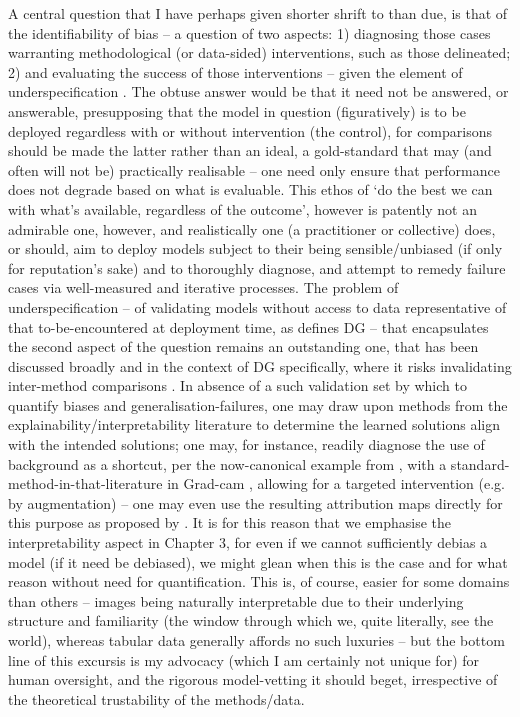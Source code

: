 %
A central question that I have perhaps given shorter shrift to than due, is that of the
identifiability of bias -- a question of two aspects: 1) diagnosing those cases warranting
methodological (or data-sided) interventions, such as those delineated; 2) and evaluating the
success of those interventions -- given the element of underspecification
\citep{semenova2019study}.
%
The obtuse answer would be that it need not be answered, or answerable, presupposing that the model
in question (figuratively) is to be deployed regardless with or without intervention (the control),
for comparisons should be made \wrt{} the latter rather than \wrt{} an ideal, a gold-standard that
may (and often will not be) practically realisable -- one need only ensure that performance does
not degrade based on what is evaluable.
%
%
This ethos of `do the best we can with what's available, regardless of the outcome', however is
patently not an admirable one, however, and realistically one (a practitioner or collective) does,
or should, aim to deploy models subject to their being sensible/unbiased (if only for reputation's
sake) and to thoroughly diagnose, and attempt to remedy failure cases via well-measured and
iterative processes.
%
The problem of underspecification -- of validating models without access to data representative of
that to-be-encountered at deployment time, as defines DG -- that encapsulates the second aspect of
the question remains an outstanding one, that has been discussed broadly and in the context of DG
specifically, where it risks invalidating inter-method comparisons \citep{gulrajani2020search}.
%
%
In absence of a such validation set by which to quantify biases and generalisation-failures, one
may draw upon methods from the explainability/interpretability literature \citep{gunning2019xai} to
determine the learned solutions align with the intended solutions; one may, for instance, readily
diagnose the use of background as a shortcut, per the now-canonical example from
\cite{beery2018recognition}, with a standard-method-in-that-literature in Grad-cam
\cite{selvaraju2017grad}, allowing for a targeted intervention (e.g. by augmentation) -- one may
even use the resulting attribution maps directly for this purpose as proposed by
\cite{taghanaki2022masktune}.
%
It is for this reason that we emphasise the interpretability aspect in Chapter 3, for even if we
cannot sufficiently debias a model (if it need be debiased), we might glean when this is the case
and for what reason without need for quantification.
%
This is, of course, easier for some domains than others -- images being naturally interpretable due
to their underlying structure and familiarity (the window through which we, quite literally, see
the world), whereas tabular data generally affords no such luxuries -- but the bottom line of this
excursis is my advocacy (which I am certainly not unique for) for human oversight, and the rigorous
model-vetting it should beget, irrespective of the theoretical trustability of the methods/data.
 
